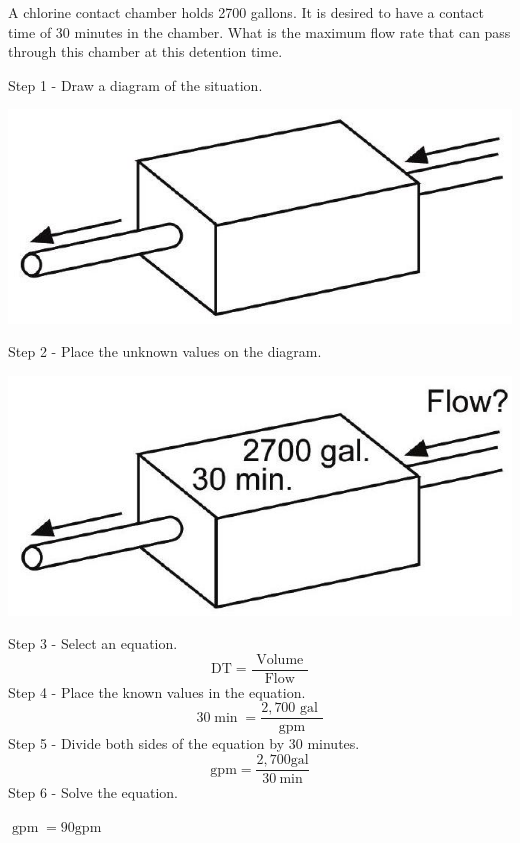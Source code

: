 \documentclass[10pt]{article}
\begin{document}
A chlorine contact chamber holds 2700 gallons. It is desired to have a contact time of 30 minutes in the chamber. What is the maximum flow rate that can pass through this chamber at this detention time.

Step 1 - Draw a diagram of the situation.

\includegraphics[max width=\textwidth]{2022_09_11_72dbedc910e6e984560cg-23}

Step 2 - Place the unknown values on the diagram.

\includegraphics[max width=\textwidth]{2022_09_11_72dbedc910e6e984560cg-23(1)}

Step 3 - Select an equation.
$$
\mathrm{DT}=\frac{\text { Volume }}{\text { Flow }}
$$
Step 4 - Place the known values in the equation.
$$
30 \min =\frac{2,700 \text { gal }}{\text { gpm }}
$$
Step 5 - Divide both sides of the equation by 30 minutes.
$$
\mathrm{gpm}=\frac{2,700 \mathrm{gal}}{30 \mathrm{~min}}
$$
Step 6 - Solve the equation.

$\operatorname{gpm}=90 \mathrm{gpm}$
\end{document}
